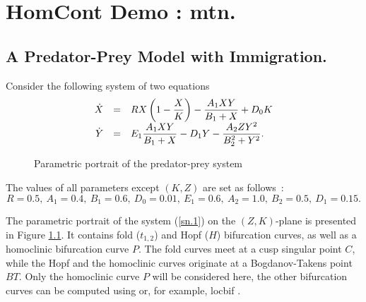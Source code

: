 \documentclass[12pt]{report}
\begin{document}
\chapter{ {\cal HomCont} Demo : mtn.} \label{ch:HomCont_mtn}

\section{ A Predator-Prey Model with Immigration.}
Consider the following system of two equations \cite{Sc:95}
\begin{equation} \label{sn.1} \begin{array}{rcl}
\dot{X} & = & RX\left(1-{\displaystyle \frac{X}{K}}\right) - 
{\displaystyle \frac{A_1XY}{B_1+X}} + D_0K \\
\dot{Y} & = & E_1 {\displaystyle \frac{A_1XY}{B_1+X}} - D_1Y - 
{\displaystyle\frac{A_2ZY^2}{B_2^2+Y^2}}.
\end{array} \end{equation}
\begin{figure}[b]
\epsfysize 10.0cm
\centerline{}
\caption{Parametric portrait of the predator-prey system }
\label{SNF.1}
\end{figure}
The values of all parameters except $(K,Z)$ are set as follows~:
$$
R=0.5,\ A_1=0.4,\ B_1=0.6,\ D_0=0.01,\ E_1=0.6,\ A_2=1.0,\ B_2=0.5,\ D_1=0.15.
$$
\par
\noindent
The parametric portrait of the system (\ref{sn.1}) on the
$(Z,K)$-plane is presented in Figure \ref{SNF.1}. It contains fold
($t_{1,2}$) and Hopf ($H$) bifurcation curves, as well as a homoclinic
bifurcation curve $P$. The fold curves meet at a cusp singular point
$C$, while the Hopf and the homoclinic curves originate at a
Bogdanov-Takens point $BT$. Only the homoclinic curve $P$ will be 
considered here, the other bifurcation curves can be computed using
\AUTO or,
for example, {\cal locbif} \cite{KhKuLeNi:93}.
\end{document}
